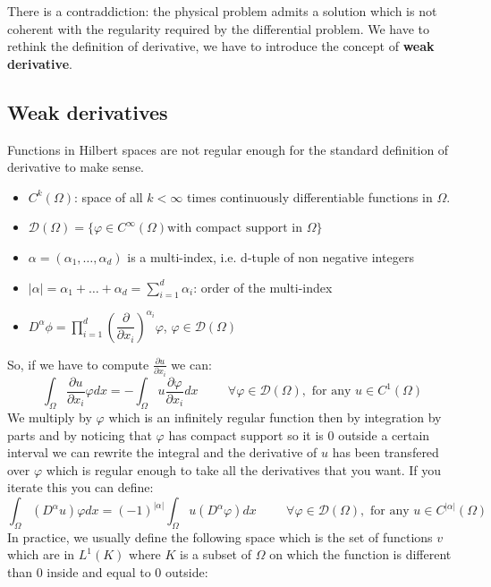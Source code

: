 There is a contraddiction: the physical problem admits a solution which is not coherent with the regularity required by the differential problem. We have to rethink the definition of derivative, we have to introduce the concept of \textbf{weak derivative}.\\

\subsection*{Weak derivatives}
Functions in Hilbert spaces are not regular enough for the standard definition of derivative to make sense. 
\begin{itemize}
    \item $C^k(\Omega)$: space of all $k < \infty$ times continuously differentiable functions in $\Omega$.
    \item $\mathcal{D}(\Omega) = \{\varphi \in C^\infty(\Omega) \text{with compact support in }\Omega\}$
    \item $\alpha = (\alpha_1, \dots, \alpha_d)$ is a multi-index, i.e. d-tuple of non negative integers
    \item $|\alpha| = \alpha_1 + \dots + \alpha_d = \sum_{i=1}^{d} \alpha_i$: order of the multi-index
    \item $D^\alpha \phi = \prod\limits_{i=1}^{d}\left(\dfrac{\partial}{\partial x_i}\right)^{\alpha_i} \varphi$, \hspace{0.1cm} $\varphi \in \mathcal{D}(\Omega)$
\end{itemize}
So, if we have to compute $\frac{\partial u}{\partial x_i}$ we can:
\[
    \int_{\Omega} \dfrac{\partial u}{\partial x_i} \varphi dx =  - \int_{\Omega} u \dfrac{\partial \varphi}{\partial x_i} dx \hspace{1cm} \forall \varphi \in \mathcal{D}(\Omega), \text{ for any } u \in C^1(\Omega)    
\]
We multiply by $\varphi$ which is an infinitely regular function then by integration by parts and by noticing that $\varphi$ has compact support so it is 0 outside a certain interval we can rewrite the integral and the derivative of $u$ has been transfered over $\varphi$ which is regular enough to take all the derivatives that you want. If you iterate this you can define:
\[
    \int_{\Omega} (D^\alpha u)\varphi dx = (-1)^{|\alpha|}\int_{\Omega} u(D^\alpha \varphi) dx \hspace{1cm} \forall \varphi \in \mathcal{D}(\Omega), \text{ for any } u \in C^{|\alpha|}(\Omega)    
\]
In practice, we usually define the following space which is the set of functions $v$ which are in $L^1(K)$ where $K$ is a subset of $\Omega$ on which the function is different than 0 inside and equal to 0 outside: 
